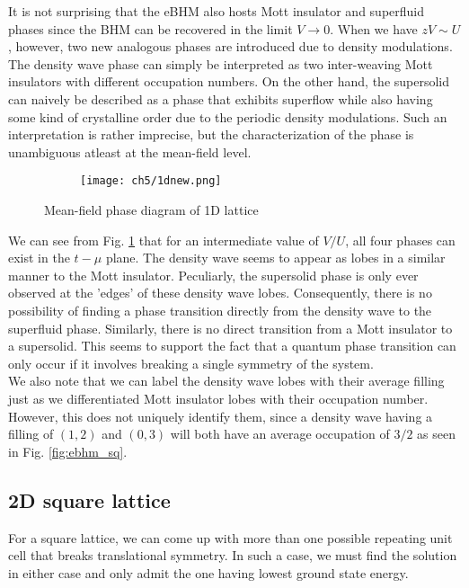 It is not surprising that the eBHM also hosts Mott insulator and superfluid phases since the BHM can be recovered in the limit $V\to 0$. When we have $zV \sim U$, however, two new analogous phases are introduced due to density modulations. The density wave phase can simply be interpreted as two inter-weaving Mott insulators with different occupation numbers. On the other hand, the supersolid can naively be described as a phase that exhibits superflow while also having some kind of crystalline order due to the periodic density modulations. Such an interpretation is rather imprecise\cite{Boninsegni_2012}, but the characterization of the phase is unambiguous atleast at the mean-field level.

\begin{figure}[!htb]
    \centering
    \begin{subfigure}[b]{\textwidth}  %
        \centering
        \texttt{[image: ch5/1dnew.png]}
    \end{subfigure}
    \caption{Mean-field phase diagram of 1D lattice}
    \label{fig:ebhm_1d}
\end{figure}
\FloatBarrier \!\!\!\!\!\!\!\!\!\!\!

We can see from Fig. \ref{fig:ebhm_1d} that for an intermediate value of $V/U$, all four phases can exist in the $t-\mu$ plane. The density wave seems to appear as lobes in a similar manner to the Mott insulator. Peculiarly, the supersolid phase is only ever observed at the 'edges' of these density wave lobes. Consequently, there is no possibility of finding a phase transition directly from the density wave to the superfluid phase. Similarly, there is no direct transition from a Mott insulator to a supersolid. This seems to support the fact that a quantum phase transition can only occur if it involves breaking a single symmetry of the system.
\vspace{0.5cm}\\
We also note that we can label the density wave lobes with their average filling just as we differentiated Mott insulator lobes with their occupation number. However, this does not uniquely identify them, since a density wave having a filling of $(1, 2)$ and $(0, 3)$ will both have an average occupation of $3/2$ as seen in Fig. \ref{fig:ebhm_sq}.

\newpage
\subsection{2D square lattice}
For a square lattice, we can come up with more than one possible repeating unit cell that breaks translational symmetry. In such a case, we must find the solution in either case and only admit the one having lowest ground state energy.

